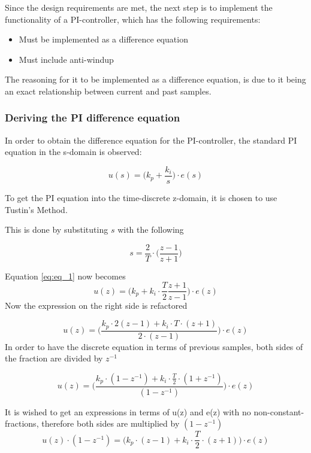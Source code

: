 \documentclass[../../../main]{subfiles}
\begin{document}
Since the design requirements are met, the next step is to implement the functionality of a PI-controller, which has the following requirements:
\begin{itemize}
    \item Must be implemented as a difference equation
    \item Must include anti-windup
\end{itemize}
The reasoning for it to be implemented as a difference equation, is due to it being an exact relationship between current and past samples.

\subsubsection{Deriving the PI difference equation}

In order to obtain the difference equation for the PI-controller, the standard PI equation in the s-domain is observed:

\begin{equation}
  u(s) = \Bigg(k_p + \frac{k_i}{s} \Bigg) \cdot e(s) \label{eq:eq_1}
\end{equation}


To get the PI equation into the time-discrete z-domain, it is chosen to use Tustin's Method.

This is done by substituting $s$ with the following

$$
s = \frac{2}{T}\cdot \Bigg( \frac{z-1}{z+1}\Bigg)
$$

Equation \eqref{eq:eq_1} now becomes
$$
  u(z) = \Bigg(k_p + k_i\cdot \frac{T}{2} \frac{z+1}{z-1} \Bigg) \cdot e(z)
$$
Now the expression on the right side is refactored

$$
  u(z) = \Bigg( \frac{k_p \cdot 2(z-1) + k_i \cdot T \cdot (z+1)}{2\cdot (z-1)}\Bigg) \cdot e(z)
$$
In order to have the discrete equation in terms of previous samples, both sides of the fraction are divided by $z^{-1}$

$$
  u(z) = \Bigg( \frac{k_p \cdot(1-z^{-1}) + k_i \cdot \frac{T}{2} \cdot (1+z^{-1}) }{(1-z^{-1})}\Bigg) \cdot e(z)
$$

It is wished to get an expressions in terms of u(z) and e(z) with no non-constant-fractions, therefore both sides are multiplied by $(1 - z^{-1})$
$$
  u(z)\cdot(1 - z^{-1}) = \Bigg( k_p \cdot(z-1) + k_i \cdot \frac{T}{2} \cdot (z+1) \Bigg) \cdot e(z)
$$
\end{document}
